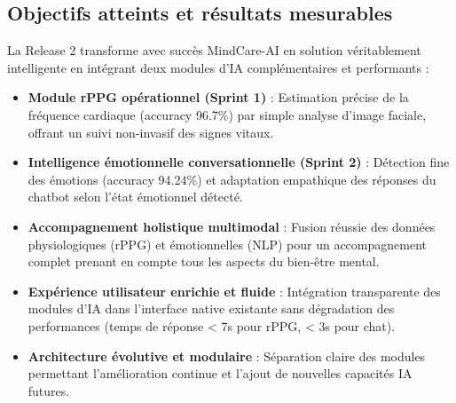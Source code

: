 \subsection{Objectifs atteints et résultats mesurables}
La Release 2 transforme avec succès MindCare-AI en solution véritablement intelligente en intégrant deux modules d'IA complémentaires et performants :
\begin{itemize}
    \item \textbf{Module rPPG opérationnel (Sprint 1)} : Estimation précise de la fréquence cardiaque (accuracy 96.7\%) par simple analyse d'image faciale, offrant un suivi non-invasif des signes vitaux.
    
    \item \textbf{Intelligence émotionnelle conversationnelle (Sprint 2)} : Détection fine des émotions (accuracy 94.24\%) et adaptation empathique des réponses du chatbot selon l'état émotionnel détecté.
    
    \item \textbf{Accompagnement holistique multimodal} : Fusion réussie des données physiologiques (rPPG) et émotionnelles (NLP) pour un accompagnement complet prenant en compte tous les aspects du bien-être mental.
    
    \item \textbf{Expérience utilisateur enrichie et fluide} : Intégration transparente des modules d'IA dans l'interface native existante sans dégradation des performances (temps de réponse < 7s pour rPPG, < 3s pour chat).
    
    \item \textbf{Architecture évolutive et modulaire} : Séparation claire des modules permettant l'amélioration continue et l'ajout de nouvelles capacités IA futures.
\end{itemize}

